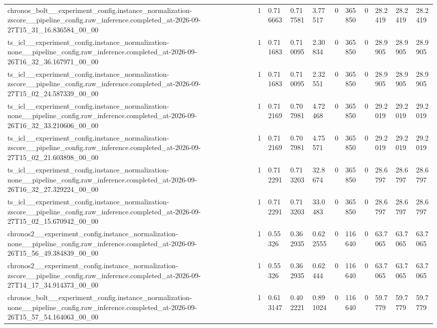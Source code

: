 \begin{tabular}{lllllllllll}
chronos\_bolt\_\_experiment\_config.instance\_normalization-zscore\_\_pipeline\_config.raw\_inference.completed\_at-2026-09-27T15\_31\_16.836584\_00\_00 & 1 & 0.716663 & 0.717581 & 3.77517 & 0 & 365850 & 0 & 28.2419 & 28.2419 & 28.2419 \\
ts\_icl\_\_experiment\_config.instance\_normalization-none\_\_pipeline\_config.raw\_inference.completed\_at-2026-09-26T16\_32\_36.167971\_00\_00 & 1 & 0.711683 & 0.710095 & 2.30834 & 0 & 365850 & 0 & 28.9905 & 28.9905 & 28.9905 \\
ts\_icl\_\_experiment\_config.instance\_normalization-zscore\_\_pipeline\_config.raw\_inference.completed\_at-2026-09-27T15\_02\_24.587339\_00\_00 & 1 & 0.711683 & 0.710095 & 2.32551 & 0 & 365850 & 0 & 28.9905 & 28.9905 & 28.9905 \\
ts\_icl\_\_experiment\_config.instance\_normalization-none\_\_pipeline\_config.raw\_inference.completed\_at-2026-09-26T16\_32\_33.210606\_00\_00 & 1 & 0.712169 & 0.707981 & 4.72468 & 0 & 365850 & 0 & 29.2019 & 29.2019 & 29.2019 \\
ts\_icl\_\_experiment\_config.instance\_normalization-zscore\_\_pipeline\_config.raw\_inference.completed\_at-2026-09-27T15\_02\_21.603898\_00\_00 & 1 & 0.712169 & 0.707981 & 4.75571 & 0 & 365850 & 0 & 29.2019 & 29.2019 & 29.2019 \\
ts\_icl\_\_experiment\_config.instance\_normalization-none\_\_pipeline\_config.raw\_inference.completed\_at-2026-09-26T16\_32\_27.329224\_00\_00 & 1 & 0.712291 & 0.713203 & 32.8674 & 0 & 365850 & 0 & 28.6797 & 28.6797 & 28.6797 \\
ts\_icl\_\_experiment\_config.instance\_normalization-zscore\_\_pipeline\_config.raw\_inference.completed\_at-2026-09-27T15\_02\_15.670942\_00\_00 & 1 & 0.712291 & 0.713203 & 33.0483 & 0 & 365850 & 0 & 28.6797 & 28.6797 & 28.6797 \\
chronos2\_\_experiment\_config.instance\_normalization-none\_\_pipeline\_config.raw\_inference.completed\_at-2026-09-26T15\_56\_49.384839\_00\_00 & 1 & 0.55326 & 0.362935 & 0.622555 & 0 & 116640 & 0 & 63.7065 & 63.7065 & 63.7065 \\
chronos2\_\_experiment\_config.instance\_normalization-zscore\_\_pipeline\_config.raw\_inference.completed\_at-2026-09-27T14\_17\_34.914373\_00\_00 & 1 & 0.55326 & 0.362935 & 0.62444 & 0 & 116640 & 0 & 63.7065 & 63.7065 & 63.7065 \\
chronos\_bolt\_\_experiment\_config.instance\_normalization-none\_\_pipeline\_config.raw\_inference.completed\_at-2026-09-26T15\_57\_54.164063\_00\_00 & 1 & 0.613147 & 0.402221 & 0.891024 & 0 & 116640 & 0 & 59.7779 & 59.7779 & 59.7779 \\

\end{tabular}
